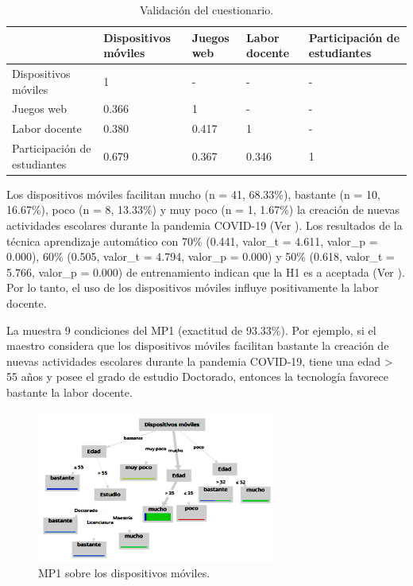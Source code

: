 \documentclass[spanish]{textolivre}
\begin{document}
\begin{table}[htbp]
\caption{Validación del cuestionario.}
\label{tab4}
\begin{tabular}{p{}p{}p{}p{}p{}}
\toprule 
& Dispositivos móviles & Juegos web & Labor docente & Participación de estudiantes
\\ 
\midrule
Dispositivos móviles & 1 & - & - & -
\\
Juegos web & 0.366 & 1 & - & -
\\
Labor docente & 0.380 & 0.417 & 1 & -
\\
Participación de estudiantes & 0.679 & 0.367 & 0.346 & 1
\\
\bottomrule
\end{tabular}
\end{table}

Los dispositivos móviles facilitan mucho (n = 41, 68.33\%), bastante (n = 10, 16.67\%), poco (n = 8, 13.33\%) y muy poco (n = 1, 1.67\%) la creación de nuevas actividades escolares durante la pandemia COVID-19 (Ver ). Los resultados de  la técnica aprendizaje automático con 70\% (0.441, valor\_t = 4.611, valor\_p = 0.000), 60\% (0.505, valor\_t = 4.794, valor\_p = 0.000) y 50\% (0.618, valor\_t = 5.766, valor\_p = 0.000) de entrenamiento indican que la H1 es a aceptada (Ver ). Por lo tanto, el uso de los dispositivos móviles influye positivamente la labor docente.

La  muestra 9 condiciones del MP1 (exactitud de 93.33\%). Por ejemplo, si el maestro considera que los dispositivos móviles facilitan bastante la creación de nuevas actividades escolares durante la pandemia COVID-19, tiene una edad > 55 años y posee el grado de estudio Doctorado, entonces la tecnología favorece bastante la labor docente.

\begin{figure}[htbp]
 \centering
 \includegraphics[width=0.7\textwidth]{37074-pag3.png}
 \caption{MP1 sobre los dispositivos móviles.}
 \label{fig3}
\end{figure}
\end{document}
